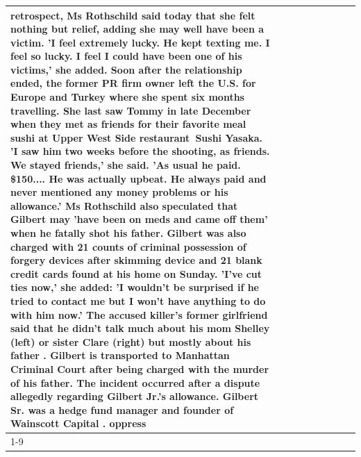 \begin{table}[H]
\begin{tabular}{lllrlllll}
retrospect, Ms Rothschild said today that she felt nothing but relief, adding she may well have been a victim. 'I feel extremely lucky. He kept texting me. I feel so lucky. I feel I could have been one of his victims,' she added. Soon after the relationship ended, the former PR firm owner left the U.S. for Europe and Turkey where she spent six months  travelling. She last saw Tommy in late December when they met as friends for their favorite meal sushi at Upper West Side restaurant Sushi Yasaka. 'I saw him two weeks before the shooting, as friends. We stayed friends,' she said. 'As usual he paid. \$150.... He was actually upbeat. He always paid and never mentioned any money problems or his allowance.' Ms Rothschild also speculated that Gilbert may 'have been on meds and came off them' when he fatally shot his father. Gilbert was also charged with 21 counts of criminal possession of forgery devices after skimming device and 21 blank credit cards found at his home on Sunday. 'I've cut ties now,' she added: 'I wouldn’t be surprised if he tried to contact me but I won’t have anything to do with him now.' The accused killer's former girlfriend said that he didn't talk much about his mom Shelley (left) or sister Clare (right) but mostly about his father . Gilbert is transported to Manhattan Criminal Court  after being charged with the murder of his father. The incident occurred after a dispute allegedly regarding Gilbert Jr.'s allowance. Gilbert Sr. was a hedge fund manager and founder of Wainscott Capital . oppress \\
\cline{1-9} \cline{2-9}

\end{tabular}
\end{table}
